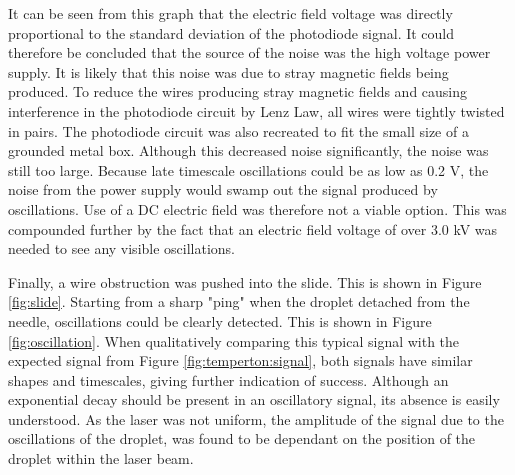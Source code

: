 \documentclass{physics_article_B}
\begin{document}
        It can be seen from this graph that the electric field voltage was directly proportional to the standard deviation of the photodiode signal. It could therefore be concluded that the source of the noise was the high voltage power supply. It is likely that this noise was due to stray magnetic fields being produced. To reduce the wires producing stray magnetic fields and causing interference in the photodiode circuit by Lenz Law, all wires were tightly twisted in pairs. The photodiode circuit was also recreated to fit the small size of a grounded metal box. Although this decreased noise significantly, the noise was still too large. Because late timescale oscillations could be as low as 0.2 V, the noise from the power supply would swamp out the signal produced by oscillations. Use of a DC electric field was therefore not a viable option. This was compounded further by the fact that an electric field voltage of over 3.0 kV was needed to see any visible oscillations. 
        
        Finally, a wire obstruction was pushed into the slide. This is shown in Figure \ref{fig:slide}. Starting from a sharp "ping" when the droplet detached from the needle, oscillations could be clearly detected. This is shown in Figure \ref{fig:oscillation}. When qualitatively comparing this typical signal with the expected signal from Figure \ref{fig:temperton:signal}, both signals have similar shapes and timescales, giving further indication of success. Although an exponential decay should be present in an oscillatory signal, its absence is easily understood. As the laser was not uniform, the amplitude of the signal due to the oscillations of the droplet, was found to be dependant on the position of the droplet within the laser beam. 
        
\end{document}
